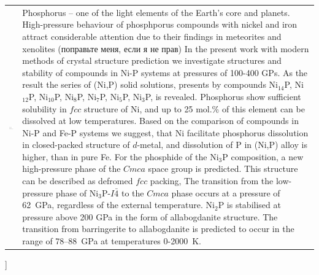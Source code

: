 \documentclass[twoside,twocolumn,9pt]{article}
\begin{document}
\begin{@twocolumnfalse}
\begin{tabular}{m{4.5cm} p{13.5cm} }
\includegraphics{head_foot/dates} & \noindent\normalsize{
%
Phosphorus – one of the light elements of the Earth's core and planets.
High-pressure behaviour of phosphporus compounds with nickel and iron attract considerable attention due to their findings in meteorites and xenolites (поправьте меня, если я не прав)
In the present work with modern methods of crystal structure prediction we investigate structures and stability of compounds in Ni-P systems at pressures of 100-400 GPs.
As the result the series of (Ni,P) solid solutions, presents by compounds Ni$_{14}$P, Ni$_{12}$P, Ni$_{10}$P, Ni$_8$P, Ni$_7$P, Ni$_5$P, Ni$_3$P, is revealed.
Phosphorus show sufficient solubility in $fcc$ structure of Ni, and up to 25 mol.\% of this element can be dissolved at low temperatures.
Based on the comparison of compounds in Ni-P and Fe-P systems we suggest, that Ni facilitate phosphorus dissolution in closed-packed structure of $d$-metal, and dissolution of P in (Ni,P) alloy is higher, than in pure Fe.
For the phosphide of the Ni$_3$P composition, a new high-pressure phase of the $Cmca$ space group is predicted. 
This structure can be described as defromed $fcc$ packing,
The transition from the low-pressure phase of Ni$_3$P-$I\bar{4}$ to the $Cmca$ phase occurs at a pressure of 62~GPa, regardless of the external temperature. 
Ni$_2$P is stabilised at pressure above 200 GPa in the form of allabogdanite structure.
The transition from barringerite to allabogdanite is predicted to occur in the range of 78--88~GPa at temperatures 0-2000~K. 


%
} \\%

\end{tabular}

 \end{@twocolumnfalse} \vspace{0.6cm}

]

\renewcommand*\rmdefault{bch}\normalfont\upshape
\rmfamily
\end{document}
